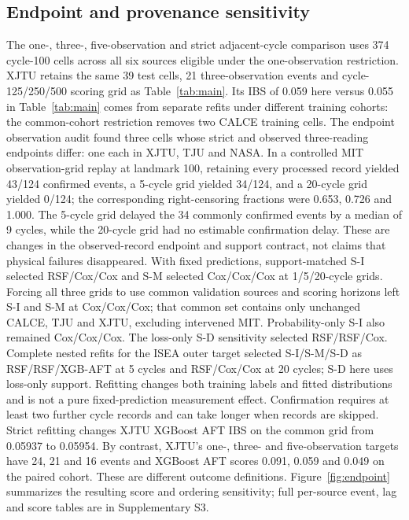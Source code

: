 \documentclass[preprint,12pt]{elsarticle}
\begin{document}
\subsection{Endpoint and provenance sensitivity}
The one-, three-, five-observation and strict adjacent-cycle comparison uses 374 cycle-100 cells across all six sources eligible under the one-observation restriction. XJTU retains the same 39 test cells, 21 three-observation events and cycle-125/250/500 scoring grid as Table~\ref{tab:main}. Its IBS of 0.059 here versus 0.055 in Table~\ref{tab:main} comes from separate refits under different training cohorts: the common-cohort restriction removes two CALCE training cells. The endpoint observation audit found three cells whose strict and observed three-reading endpoints differ: one each in XJTU, TJU and NASA. In a controlled MIT observation-grid replay at landmark 100, retaining every processed record yielded 43/124 confirmed events, a 5-cycle grid yielded 34/124, and a 20-cycle grid yielded 0/124; the corresponding right-censoring fractions were 0.653, 0.726 and 1.000. The 5-cycle grid delayed the 34 commonly confirmed events by a median of 9 cycles, while the 20-cycle grid had no estimable confirmation delay. These are changes in the observed-record endpoint and support contract, not claims that physical failures disappeared. With fixed predictions, support-matched S-I selected RSF/Cox/Cox and S-M selected Cox/Cox/Cox at 1/5/20-cycle grids. Forcing all three grids to use common validation sources and scoring horizons left S-I and S-M at Cox/Cox/Cox; that common set contains only unchanged CALCE, TJU and XJTU, excluding intervened MIT. Probability-only S-I also remained Cox/Cox/Cox. The loss-only S-D sensitivity selected RSF/RSF/Cox. Complete nested refits for the ISEA outer target selected S-I/S-M/S-D as RSF/RSF/XGB-AFT at 5 cycles and RSF/Cox/Cox at 20 cycles; S-D here uses loss-only support. Refitting changes both training labels and fitted distributions and is not a pure fixed-prediction measurement effect. Confirmation requires at least two further cycle records and can take longer when records are skipped. Strict refitting changes XJTU XGBoost AFT IBS on the common grid from 0.05937 to 0.05954. By contrast, XJTU's one-, three- and five-observation targets have 24, 21 and 16 events and XGBoost AFT scores 0.091, 0.059 and 0.049 on the paired cohort. These are different outcome definitions. Figure~\ref{fig:endpoint} summarizes the resulting score and ordering sensitivity; full per-source event, lag and score tables are in Supplementary S3.
\end{document}
